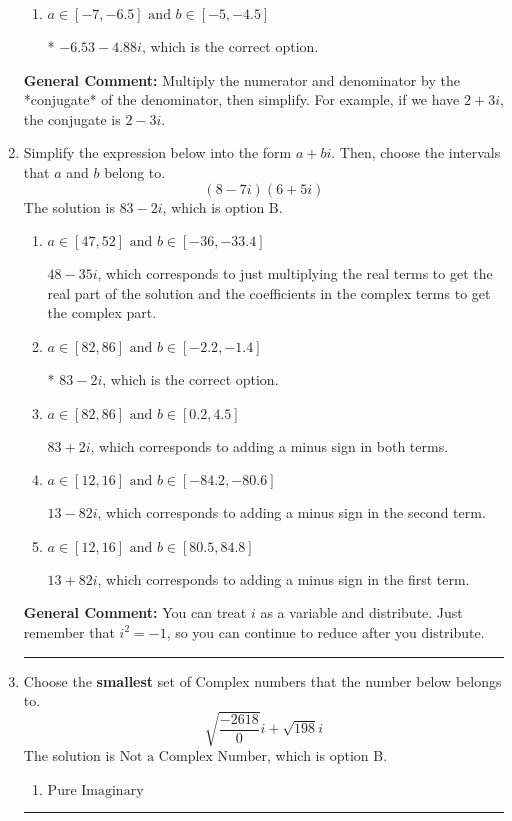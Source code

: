 \documentclass{extbook}[14pt]
\newcommand{\litem}[1]{\item #1

\rule{\textwidth}{0.4pt}}
\begin{document}
\begin{enumerate}
{\begin{enumerate}[label=\Alph*.]
 $-222.00  - 4.88 i$, which corresponds to forgetting to multiply the conjugate by the numerator and using a plus instead of a minus in the denominator.
\item \( a \in [-7, -6.5] \text{ and } b \in [-5, -4.5] \)

* $-6.53  - 4.88 i$, which is the correct option.
\end{enumerate}

\textbf{General Comment:} Multiply the numerator and denominator by the *conjugate* of the denominator, then simplify. For example, if we have $2+3i$, the conjugate is $2-3i$.
}
\litem{
Simplify the expression below into the form $a+bi$. Then, choose the intervals that $a$ and $b$ belong to.
\[ (8 - 7 i)(6 + 5 i) \]
The solution is \( 83 - 2 i \), which is option B.\begin{enumerate}[label=\Alph*.]
\item \( a \in [47, 52] \text{ and } b \in [-36, -33.4] \)

 $48 - 35 i$, which corresponds to just multiplying the real terms to get the real part of the solution and the coefficients in the complex terms to get the complex part.
\item \( a \in [82, 86] \text{ and } b \in [-2.2, -1.4] \)

* $83 - 2 i$, which is the correct option.
\item \( a \in [82, 86] \text{ and } b \in [0.2, 4.5] \)

 $83 + 2 i$, which corresponds to adding a minus sign in both terms.
\item \( a \in [12, 16] \text{ and } b \in [-84.2, -80.6] \)

 $13 - 82 i$, which corresponds to adding a minus sign in the second term.
\item \( a \in [12, 16] \text{ and } b \in [80.5, 84.8] \)

 $13 + 82 i$, which corresponds to adding a minus sign in the first term.
\end{enumerate}

\textbf{General Comment:} You can treat $i$ as a variable and distribute. Just remember that $i^2=-1$, so you can continue to reduce after you distribute.
}
\litem{
Choose the \textbf{smallest} set of Complex numbers that the number below belongs to.
\[ \sqrt{\frac{-2618}{0}} i+\sqrt{198}i \]
The solution is \( \text{Not a Complex Number} \), which is option B.\begin{enumerate}[label=\Alph*.]
\item \( \text{Pure Imaginary} \)


\end{enumerate}}
\end{enumerate}
\end{document}
